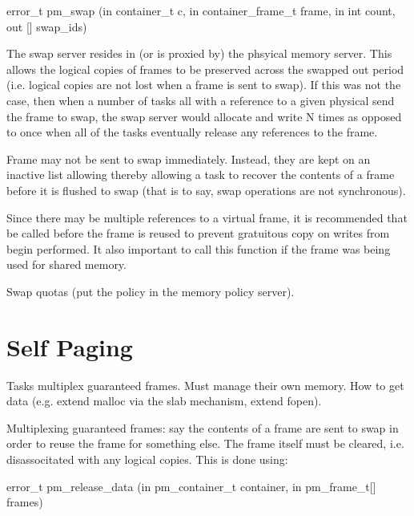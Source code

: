 \begin{code}
error\_t pm_swap (in container_t c, in container_frame_t frame, in int
count, out [] swap_ids)
\end{code}

The swap server resides in (or is proxied by) the phsyical memory
server.  This allows the logical copies of frames to be preserved
across the swapped out period (i.e. logical copies are not lost when a
frame is sent to swap).  If this was not the case, then when a number
of tasks all with a reference to a given physical send the frame to
swap, the swap server would allocate and write N times as opposed to
once when all of the tasks eventually release any references to the
frame.

Frame may not be sent to swap immediately.  Instead, they are kept on
an inactive list allowing thereby allowing a task to recover the
contents of a frame before it is flushed to swap (that is to say, swap
operations are not synchronous).

Since there may be multiple references to a virtual frame, it is
recommended that  be called
before the frame is reused to prevent gratuitous copy on writes from
begin performed.  It also important to call this function if the frame
was being used for shared memory.

Swap quotas (put the policy in the memory policy server).

\section{Self Paging}

Tasks multiplex guaranteed frames.  Must manage their own memory.  How
to get data (e.g. extend malloc via the slab mechanism, extend fopen).

Multiplexing guaranteed frames: say the contents of a frame are sent
to swap in order to reuse the frame for something else.  The frame
itself must be cleared, i.e. disassocitated with any logical copies.
This is done using:

\begin{code}
error\_t pm\_release\_data (in pm\_container\_t container, in pm\_frame\_t[] frames)
\end{code}


